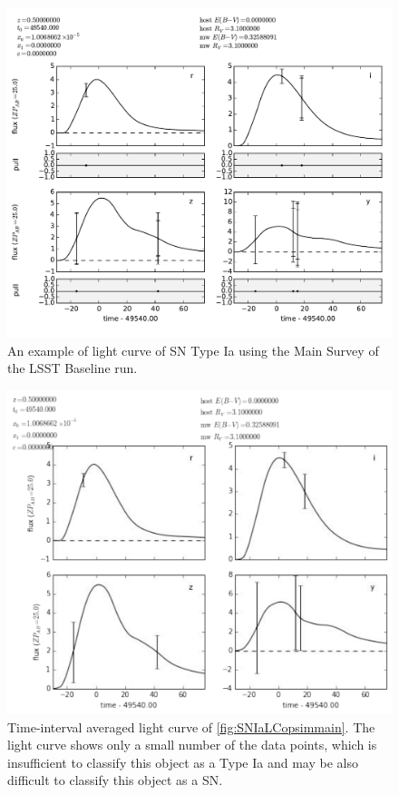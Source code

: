 \begin{figure}[tbh!]
\includegraphics[angle=0,width=0.99\hsize:,clip]{figs/SN_309_lc.pdf}
\caption{An example of light curve of SN Type Ia using the Main Survey
of the LSST Baseline \OpSim run.}
\label{fig:SNIaLCopsimmain}
\end{figure}

\begin{figure}[tbh!]
\includegraphics[angle=0,width=0.99\hsize:,clip]{figs/SN_309_lcavg.pdf}
\caption{Time-interval averaged light curve of
\autoref{fig:SNIaLCopsimmain}. The light curve shows only a small number
of the data points, which is insufficient to classify this object as a
Type Ia and may be also difficult to classify this object as a SN. }
\label{fig:SNIaLCopsimmain2}
\end{figure}



